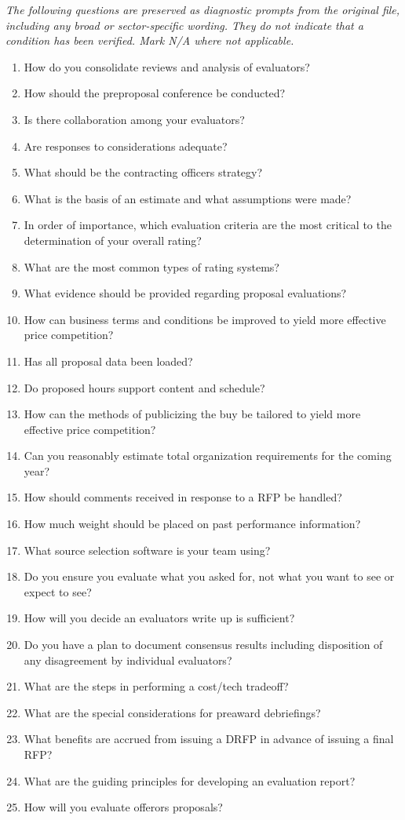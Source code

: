 \documentclass[10pt,letterpaper]{article}
\newcommand{\docsection}[1]{\par\Needspace{5\baselineskip}\vspace{8pt}{\large\sffamily\bfseries\color{navy}#1}\par\vspace{2pt}{\color{rulegrey}\rule{\linewidth}{.6pt}}\par}
\begin{document}
\docsection{03 \quad Source diagnostic checklist}
\textit{The following questions are preserved as diagnostic prompts from the original file, including any broad or sector-specific wording. They do not indicate that a condition has been verified. Mark N/A where not applicable.}
\begingroup\small\begin{enumerate}[leftmargin=2.1em, itemsep=4pt]
\item[1.] How do you consolidate reviews and analysis of evaluators?
\item[2.] How should the preproposal conference be conducted?
\item[3.] Is there collaboration among your evaluators?
\item[4.] Are responses to considerations adequate?
\item[5.] What should be the contracting officers strategy?
\item[6.] What is the basis of an estimate and what assumptions were made?
\item[7.] In order of importance, which evaluation criteria are the most critical to the determination of your overall rating?
\item[8.] What are the most common types of rating systems?
\item[9.] What evidence should be provided regarding proposal evaluations?
\item[10.] How can business terms and conditions be improved to yield more effective price competition?
\item[11.] Has all proposal data been loaded?
\item[12.] Do proposed hours support content and schedule?
\item[13.] How can the methods of publicizing the buy be tailored to yield more effective price competition?
\item[14.] Can you reasonably estimate total organization requirements for the coming year?
\item[15.] How should comments received in response to a RFP be handled?
\item[16.] How much weight should be placed on past performance information?
\item[17.] What source selection software is your team using?
\item[18.] Do you ensure you evaluate what you asked for, not what you want to see or expect to see?
\item[19.] How will you decide an evaluators write up is sufficient?
\item[20.] Do you have a plan to document consensus results including disposition of any disagreement by individual evaluators?
\item[21.] What are the steps in performing a cost/tech tradeoff?
\item[22.] What are the special considerations for preaward debriefings?
\item[23.] What benefits are accrued from issuing a DRFP in advance of issuing a final RFP?
\item[24.] What are the guiding principles for developing an evaluation report?
\item[25.] How will you evaluate offerors proposals?
\end{enumerate}\endgroup
\end{document}
